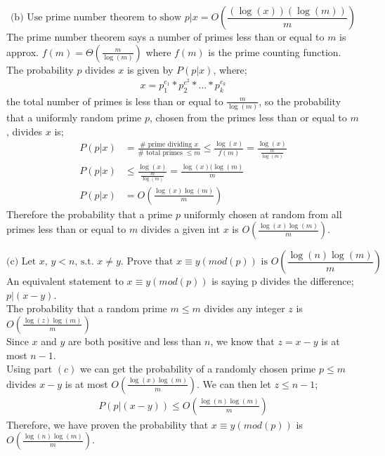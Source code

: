 \documentclass{article}
\begin{document}
\begin{enumerate}
\[
\text{(b) Use prime number theorem to show } p | x = O(\frac{(\log(x))(\log(m))}{m})
\]
The prime number theorem says a number of primes less than or equal to $m$ is approx. $f(m) = \Theta(\frac{m}{\log(m)})$ where $f(m)$ is the prime counting function. \\
The probability $p$ divides $x$ is given by $P(p | x)$, where; 
\begin{align*}
    x = p_{1}^{e_{1}} * p_{2}^{e^{2}} * \dots * p_{k}^{e_{k}}
\end{align*}
the total number of primes is less than or equal to $\frac{m}{\log(m)}$, so the probability that a uniformly random prime $p$, chosen from the primes less than or equal to $m$, divides $x$ is; \\
\begin{align*}
    P(p | x) & = \frac{\text{# prime dividing $x$}}{\text{# total primes } \leq m} \leq \frac{\log(x)}{f(m)} = \frac{\log(x)}{\frac{m}{\log(m)}} \\
    P(p | x) & \leq \frac{\log(x)}{\frac{m}{\log(m)}} = \frac{\log(x)(\log(m)}{m} \\
    P(p | x) & = O(\frac{\log(x)\log(m)}{m})
\end{align*}
Therefore the probability that a prime $p$ uniformly chosen at random from all primes less than or equal to $m$ divides a given int $x$ is $O(\frac{\log(x)\log(m)}{m})$.





\[
\text{(c) Let } x \text{, } y < n \text{, s.t. } x \neq y \text{. Prove that } x \equiv y (mod(p)) \text{ is } O(\frac{\log(n)\log(m)}{m})
\]
An equivalent statement to $x \equiv y (mod(p))$ is saying p divides the difference; $p | (x-y)$. \\
The probability that a random prime $m \leq m$ divides any integer $z$ is $O(\frac{\log(z)\log(m)}{m})$ \\
Since $x$ and $y$ are both positive and less than $n$, we know that $z = x - y$ is at most $n-1$. \\
\newline 
Using part $(c)$ we can get the probability of a randomly chosen prime $p \leq m$ divides $x-y$ is at most $O(\frac{\log(x)\log(m)}{m})$. We can then let $z \leq n - 1$; \\
\begin{align*}
    P(p | (x-y)) \leq O(\frac{\log(n)\log(m)}{m})
\end{align*}
Therefore, we have proven the probability that $x \equiv y(mod(p))$ is $O(\frac{\log(n)\log(m)}{m})$.








\end{enumerate}
\end{document}
